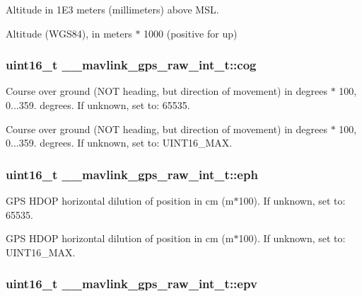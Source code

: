 Altitude in 1\+E3 meters (millimeters) above M\+S\+L. 

Altitude (W\+G\+S84), in meters $\ast$ 1000 (positive for up) \hypertarget{struct____mavlink__gps__raw__int__t_adbe4dfbea17d1fd08a0841ce29e32637}{
\subsubsection[{cog}]{\setlength{\rightskip}{0pt plus 5cm}uint16\+\_\+t \+\_\+\+\_\+mavlink\+\_\+gps\+\_\+raw\+\_\+int\+\_\+t\+::cog}}\label{struct____mavlink__gps__raw__int__t_adbe4dfbea17d1fd08a0841ce29e32637}


Course over ground (N\+O\+T heading, but direction of movement) in degrees $\ast$ 100, 0...359. degrees. If unknown, set to\+: 65535. 

Course over ground (N\+O\+T heading, but direction of movement) in degrees $\ast$ 100, 0...359. degrees. If unknown, set to\+: U\+I\+N\+T16\+\_\+\+M\+A\+X. \hypertarget{struct____mavlink__gps__raw__int__t_ad7ec0749ffe37d3ada65b701be2cd305}{
\subsubsection[{eph}]{\setlength{\rightskip}{0pt plus 5cm}uint16\+\_\+t \+\_\+\+\_\+mavlink\+\_\+gps\+\_\+raw\+\_\+int\+\_\+t\+::eph}}\label{struct____mavlink__gps__raw__int__t_ad7ec0749ffe37d3ada65b701be2cd305}


G\+P\+S H\+D\+O\+P horizontal dilution of position in cm (m$\ast$100). If unknown, set to\+: 65535. 

G\+P\+S H\+D\+O\+P horizontal dilution of position in cm (m$\ast$100). If unknown, set to\+: U\+I\+N\+T16\+\_\+\+M\+A\+X. \hypertarget{struct____mavlink__gps__raw__int__t_a0d50bc6cc0e56d9f49885e3e550ec944}{
\subsubsection[{epv}]{\setlength{\rightskip}{0pt plus 5cm}uint16\+\_\+t \+\_\+\+\_\+mavlink\+\_\+gps\+\_\+raw\+\_\+int\+\_\+t\+::epv}}\label{struct____mavlink__gps__raw__int__t_a0d50bc6cc0e56d9f49885e3e550ec944}


